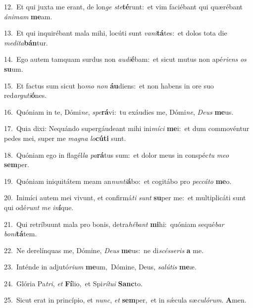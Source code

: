 {\numbfont\textcolor{\numbcolor}{12.}}~Et qui juxta me erant, de lon\textit{ge} \textit{ste}\-\textbf{té}runt:~\star et vim faciébant qui quærébant \textit{á}\-\textit{ni}\textit{mam} \textbf{me}\-am.\par
{\numbfont\textcolor{\numbcolor}{13.}}~Et qui inquirébant mala mihi, locúti sunt \textit{va}\-\textit{ni}\textbf{tá}tes:~\star et dolos tota die \textit{me}\-\textit{di}\textit{ta}\textbf{bán}tur.\par
{\numbfont\textcolor{\numbcolor}{14.}}~Ego autem tamquam surdus non \textit{au}\-\textit{di}\textbf{é}bam:~\star et sicut mutus non apé\-\textit{ri}\-\textit{ens} \textit{os} \textbf{su}\-um.\par
{\numbfont\textcolor{\numbcolor}{15.}}~Et factus sum sicut ho\textit{mo} \textit{non} \textbf{áu}\-diens:~\star et non habens in ore suo red\-\textit{ar}\-\textit{gu}\textit{ti}\textbf{ó}nes.\par
{\numbfont\textcolor{\numbcolor}{16.}}~Quóniam in te, Dómi\-\textit{ne}\-, \textit{spe}\-\textbf{rá}vi:~\star tu exáudies me, Dómi\-\textit{ne}\-, \textit{De}\-\textit{us} \textbf{me}\-us.\par
{\numbfont\textcolor{\numbcolor}{17.}}~Quia dixi: Nequándo supergáudeant mihi ini\-\textit{mí}\-\textit{ci} \textbf{me}\-i:~\star et dum commovéntur pedes mei, super me \textit{ma}\-\textit{gna} \textit{lo}\-\textbf{cú}\textbf{ti} sunt.\par
{\numbfont\textcolor{\numbcolor}{18.}}~Quóniam ego in flagél\textit{la} \textit{pa}\-\textbf{rá}tus sum:~\star et dolor meus in conspéc\textit{tu} \textit{me}\-\textit{o} \textbf{sem}\-per.\par
{\numbfont\textcolor{\numbcolor}{19.}}~Quóniam iniquitátem meam an\-\textit{nun}\-\textit{ti}\textbf{á}bo:~\star et cogitábo pro \textit{pec}\-\textit{cá}\textit{to} \textbf{me}\-o.\par
{\numbfont\textcolor{\numbcolor}{20.}}~Inimíci autem mei vivunt, et confirmá\textit{ti} \textit{sunt} \textbf{su}\-per me:~\star et multiplicáti sunt qui odé\textit{runt} \textit{me} \textit{in}\-\textbf{í}que.\par
{\numbfont\textcolor{\numbcolor}{21.}}~Qui retríbuunt mala pro bonis, detra\-\textit{hé}\-\textit{bant} \textbf{mi}\-hi:~\star quóniam sequé\textit{bar} \textit{bo}\-\textit{ni}\textbf{tá}tem.\par
{\numbfont\textcolor{\numbcolor}{22.}}~Ne derelínquas me, Dómine, \textit{De}\-\textit{us} \textbf{me}\-us:~\star ne di\-\textit{scés}\-\textit{se}\textit{ris} \textbf{a} me.\par
{\numbfont\textcolor{\numbcolor}{23.}}~Inténde in adjutó\-\textit{ri}\-\textit{um} \textbf{me}\-um,~\star Dómine, Deus, \textit{sa}\-\textit{lú}\textit{tis} \textbf{me}\-æ.\par
{\numbfont\textcolor{\numbcolor}{24.}}~Glória Pa\-\textit{tri}\-, \textit{et} \textbf{Fí}\-lio,~\star et Spi\-\textit{rí}\-\textit{tu}\textit{i} \textbf{Sanc}\-to.\par
{\numbfont\textcolor{\numbcolor}{25.}}~Sicut erat in princípio, et \textit{nunc}\-, \textit{et} \textbf{sem}\-per,~\star et in sǽcula sæ\-\textit{cu}\-\textit{ló}\textit{rum}. \textbf{A}\-men.\par
